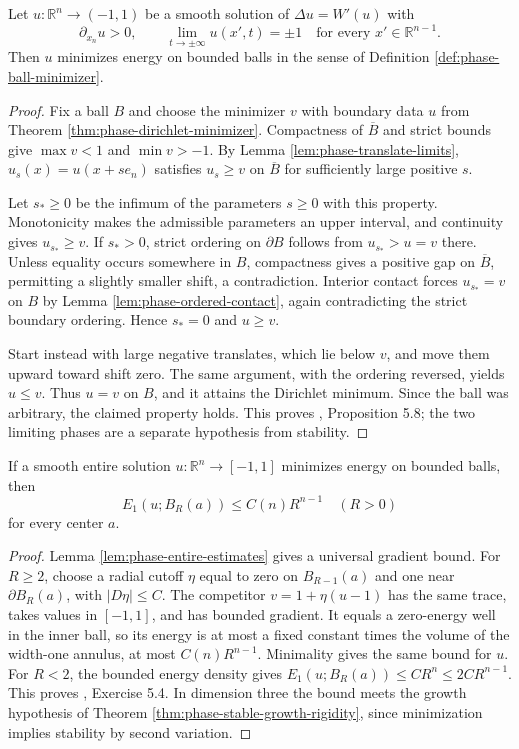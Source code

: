 \begin{theorem}\label{thm:phase-monotone-minimizing}
Let $u:\mathbb R^n\to(-1,1)$ be a smooth solution of $\Delta u=W'(u)$ with
\[
 \partial_{x_n}u>0,\qquad
 \lim_{t\to\pm\infty}u(x',t)=\pm1
 \quad\text{for every }x'\in\mathbb R^{n-1}.
\]
Then $u$ minimizes energy on bounded balls in the sense of Definition \ref{def:phase-ball-minimizer}.
\end{theorem}
\begin{proof}
Fix a ball $B$ and choose the minimizer $v$ with boundary data $u$ from Theorem \ref{thm:phase-dirichlet-minimizer}. Compactness of $\overline B$ and strict bounds give $\max v<1$ and $\min v>-1$. By Lemma \ref{lem:phase-translate-limits}, $u_s(x)=u(x+se_n)$ satisfies $u_s\geq v$ on $\overline B$ for sufficiently large positive $s$.

Let $s_*\geq0$ be the infimum of the parameters $s\geq0$ with this property. Monotonicity makes the admissible parameters an upper interval, and continuity gives $u_{s_*}\geq v$. If $s_*>0$, strict ordering on $\partial B$ follows from $u_{s_*}>u=v$ there. Unless equality occurs somewhere in $B$, compactness gives a positive gap on $\overline B$, permitting a slightly smaller shift, a contradiction. Interior contact forces $u_{s_*}=v$ on $B$ by Lemma \ref{lem:phase-ordered-contact}, again contradicting the strict boundary ordering. Hence $s_*=0$ and $u\geq v$.

Start instead with large negative translates, which lie below $v$, and move them upward toward shift zero. The same argument, with the ordering reversed, yields $u\leq v$. Thus $u=v$ on $B$, and it attains the Dirichlet minimum. Since the ball was arbitrary, the claimed property holds. This proves \cite{ChAC}, Proposition 5.8; the two limiting phases are a separate hypothesis from stability.
\end{proof}

\begin{proposition}\label{prop:phase-minimizer-growth}
If a smooth entire solution $u:\mathbb R^n\to[-1,1]$ minimizes energy on bounded balls, then
\[
 E_1(u;B_R(a))\leq C(n)R^{n-1}\quad(R>0)
\]
for every center $a$.
\end{proposition}
\begin{proof}
Lemma \ref{lem:phase-entire-estimates} gives a universal gradient bound. For $R\geq2$, choose a radial cutoff $\eta$ equal to zero on $B_{R-1}(a)$ and one near $\partial B_R(a)$, with $|D\eta|\leq C$. The competitor $v=1+\eta(u-1)$ has the same trace, takes values in $[-1,1]$, and has bounded gradient. It equals a zero-energy well in the inner ball, so its energy is at most a fixed constant times the volume of the width-one annulus, at most $C(n)R^{n-1}$. Minimality gives the same bound for $u$. For $R<2$, the bounded energy density gives $E_1(u;B_R(a))\leq CR^n\leq2CR^{n-1}$. This proves \cite{ChAC}, Exercise 5.4. In dimension three the bound meets the growth hypothesis of Theorem \ref{thm:phase-stable-growth-rigidity}, since minimization implies stability by second variation.
\end{proof}

